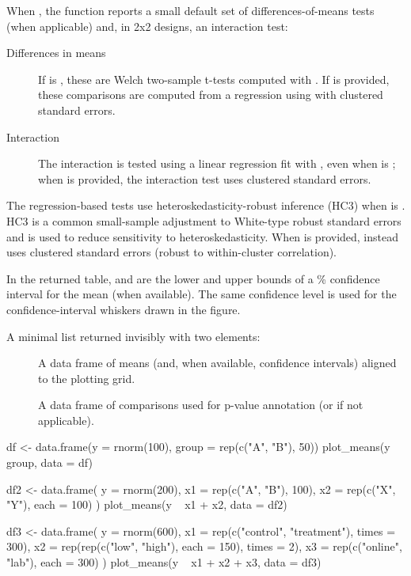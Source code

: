 \documentclass[a4paper]{book}
\begin{document}
\begin{Details}
When , the function reports a small default set of
differences-of-means tests (when applicable) and, in 2x2 designs, an
interaction test:
\begin{description}

\item[Differences in means] If  is , these are Welch
two-sample t-tests computed with . If
 is provided, these comparisons are computed from a
regression using  with clustered standard errors.
\item[Interaction] The interaction is tested using a linear regression fit
with , even when  is ; when
 is provided, the interaction test uses clustered standard
errors.

\end{description}

The regression-based tests use heteroskedasticity-robust inference (HC3) when
 is . HC3 is a common small-sample adjustment to
White-type robust standard errors and is used to reduce sensitivity to
heteroskedasticity. When  is provided, 
instead uses clustered standard errors (robust to within-cluster correlation).

In the returned  table,  and  are the lower and
upper bounds of a \% confidence interval for the mean (when
available). The same confidence level is used for the confidence-interval
whiskers drawn in the figure.
\end{Details}
%
\begin{Value}
A minimal list returned invisibly with two elements:
\begin{description}

\item[] A data frame of means (and, when available, confidence intervals)
aligned to the plotting grid.
\item[] A data frame of comparisons used for p-value
annotation (or  if not applicable).

\end{description}

\end{Value}
%
\begin{Examples}
\begin{ExampleCode}
df <- data.frame(y = rnorm(100), group = rep(c("A", "B"), 50))
plot_means(y ~ group, data = df)

df2 <- data.frame(
  y = rnorm(200),
  x1 = rep(c("A", "B"), 100),
  x2 = rep(c("X", "Y"), each = 100)
)
plot_means(y ~ x1 + x2, data = df2)

df3 <- data.frame(
  y = rnorm(600),
  x1 = rep(c("control", "treatment"), times = 300),
  x2 = rep(rep(c("low", "high"), each = 150), times = 2),
  x3 = rep(c("online", "lab"), each = 300)
)
plot_means(y ~ x1 + x2 + x3, data = df3)

\end{ExampleCode}
\end{Examples}
\end{document}
